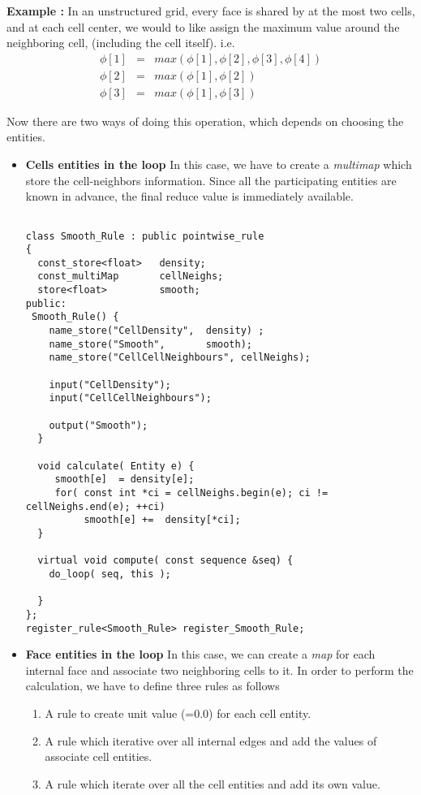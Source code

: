 \par { \bf Example :} In an unstructured grid, every face is shared by at the most 
two cells, and at each cell center, we would to like assign the maximum value 
around the neighboring cell, (including the cell itself). 
i.e.
\begin{eqnarray}
\phi[1] &=&  max ( \phi[1], \phi[2], \phi[3], \phi[4] ) \\
\phi[2] &=&  max ( \phi[1], \phi[2]) \\
\phi[3] &=&  max ( \phi[1], \phi[3])
\end{eqnarray}

\par Now there are two ways of doing this operation, which depends on choosing
the entities.

\begin{itemize}
\item { \bf Cells entities in the loop} In this case, we have to create a {\em multimap} which
store the cell-neighbors information. Since all the participating entities are 
known in advance, the final reduce value is immediately available. 
\begin{verbatim}

class Smooth_Rule : public pointwise_rule
{
  const_store<float>   density;
  const_multiMap       cellNeighs;
  store<float>         smooth;
public:
 Smooth_Rule() {
    name_store("CellDensity",  density) ;
    name_store("Smooth",       smooth);
    name_store("CellCellNeighbours", cellNeighs);

    input("CellDensity");
    input("CellCellNeighbours");

    output("Smooth");
  }

  void calculate( Entity e) {
     smooth[e]  = density[e];
     for( const int *ci = cellNeighs.begin(e); ci != cellNeighs.end(e); ++ci)
          smooth[e] +=  density[*ci];
  }

  virtual void compute( const sequence &seq) {
    do_loop( seq, this );

  }
};
register_rule<Smooth_Rule> register_Smooth_Rule;
\end{verbatim}
%
\item { \bf Face entities in the loop} In this case, we can create  a {\em map} 
for each internal face and associate two neighboring cells to it. In order to perform
the calculation, we have to define three rules as follows
\begin{enumerate}
\item  A rule to create unit value (=0.0) for each cell entity.
\item  A rule which iterative over all internal edges and add the values of associate
cell entities.
\item  A rule which iterate over all the cell entities and add its own value.
\end{enumerate}


\end{itemize}
